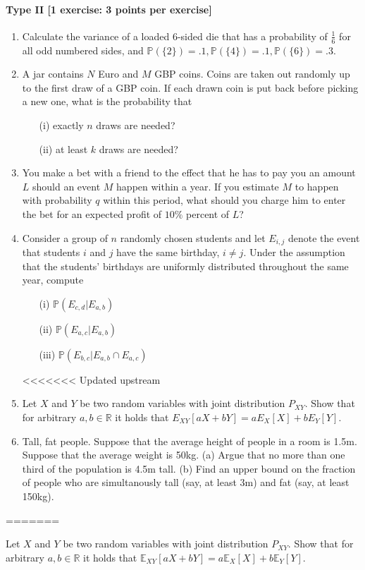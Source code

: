 \documentclass{article}
\newcommand{\E}{\mathbb{E}}
\begin{document}
\paragraph{Type II [1 exercise: 3 points per exercise]}
\begin{enumerate}
\item Calculate the variance of a loaded 6-sided die that has a probability of $\frac{1}{6}$ for all odd numbered sides, and $\mathbb{P}(\{2\}) = .1,  \mathbb{P}(\{4\}) = .1, \mathbb{P}(\{6\}) = .3$.
	\item A jar contains $N$ Euro and $M$ GBP coins. Coins are taken out randomly up to the first draw of a GBP coin. If each drawn coin is put back before picking a new one, what is the probability that
		\begin{itemize}
			\item[(i)] exactly $n$ draws are needed?
			\item[(ii)] at least $k$ draws are needed?
		\end{itemize}
	\item You make a bet with a friend to the effect that he has to pay you an amount $L$ should an event $M$ happen within a year. If you estimate $M$ to happen with probability $q$ within this period, what should you charge him to enter the bet for an expected profit of $10\%$ percent of $L$?
	\item Consider a group of $n$ randomly chosen students and let $E_{i,j}$ denote the event that students $i$ and $j$ have the same birthday, $i \neq j$. Under the assumption that the students' birthdays are uniformly distributed throughout the same year, compute
		\begin{itemize}
			\item[(i)] $\mathbb{P}(E_{c,d}|E_{a,b})$
			\item[(ii)] $\mathbb{P}(E_{a,c}|E_{a,b})$
			\item[(iii)] $\mathbb{P}(E_{b,c}|E_{a,b} \cap E_{a,c})$
		\end{itemize}
<<<<<<< Updated upstream
	\item Let $X$ and $Y$ be two random variables with joint distribution $P_{XY}$. Show that for arbitrary 		$a,b \in \mathbb{R}$ it holds that $E_{XY}[aX + bY] = a E_X[X] + b E_Y[Y].$
	\item Tall, fat people. Suppose that the average height of people in a room is 1.5m. Suppose that the average weight is 50kg.
(a) Argue that no more than one third of the population is 4.5m tall.
(b) Find an upper bound on the fraction of people who are simultanously tall (say, at least 3m) and fat (say, at least 150kg).
\end{enumerate}
=======
	\item Let $X$ and $Y$ be two random variables with joint distribution $P_{XY}$. Show that for arbitrary 		$a,b \in \mathbb{R}$ it holds that $\E_{XY}[aX + bY] = a \E_X[X] + b \E_Y[Y].$
\end{document}
